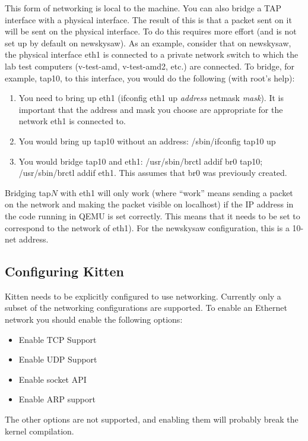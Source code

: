 \documentclass[11pt]{article}
\begin{document}
This form of networking is local to the machine.  You can also bridge
a TAP interface with a physical interface.  The result of this is that
a packet sent on it will be sent on the physical interface.  To do
this requires more effort (and is not set up by default on newskysaw).
As an example, consider that on newskysaw, the physical interface eth1
is connected to a private network switch to which the lab test
computers (v-test-amd, v-test-amd2, etc.) are connected.  To bridge,
for example, tap10, to this interface, you would do the following
(with root's help):
\begin{enumerate}
\item You need to bring up eth1 (ifconfig eth1 up {\em address}
netmask {\em mask}).  It is important that the address and mask you
choose are appropriate for the network eth1 is connected to.
\item You would bring up tap10 without an address:  /sbin/ifconfig
tap10 up
\item You would bridge tap10 and eth1:  /usr/sbin/brctl addif br0
tap10; /usr/sbin/brctl addif eth1.  This assumes that br0 was
previously created. 
\end{enumerate}

Bridging tap$N$ with eth1 will only work (where ``work'' means sending
a packet on the network and making the packet visible on localhost) if
the IP address in the code running in QEMU is set correctly.  This
means that it needs to be set to correspond to the network of eth1).  
For the newskysaw configuration, this is a 10-net address.


\subsection{Configuring Kitten}

Kitten needs to be explicitly configured to use networking. Currently
only a subset of the networking configurations are supported. To
enable an Ethernet network you should enable the following options:

\begin{itemize}
\item Enable TCP Support
\item Enable UDP Support
\item Enable socket API
\item Enable ARP support
\end{itemize}

The other options are not supported, and enabling them will probably
break the kernel compilation.
\end{document}
